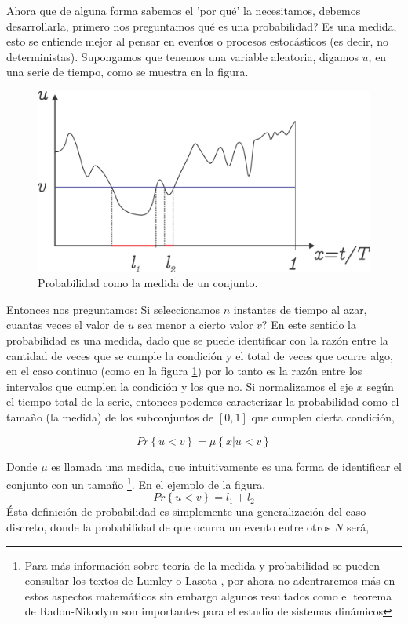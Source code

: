 \documentclass[executivepaper,12pt]{article}
\numberwithin{equation}{section}
\begin{document}
Ahora que de alguna forma sabemos el 'por qué' la necesitamos, debemos desarrollarla, primero nos preguntamos qué es una probabilidad? Es una medida, esto se entiende mejor al pensar en eventos o procesos estocásticos (es decir, no deterministas). Supongamos que tenemos una variable aleatoria, digamos $u$, en una serie de tiempo, como se muestra en la figura.

\begin{figure}[H]
	\begin{center}
		\includegraphics[scale=0.9]{probabilidad1}
	\end{center}
	\caption{Probabilidad como la medida de un conjunto.}
	\label{fig-prob1}
\end{figure}


Entonces nos preguntamos: Si seleccionamos $n$ instantes de tiempo al azar, cuantas veces el valor de $u$ sea menor a cierto valor $v$?  En este sentido la probabilidad es una medida, dado que se puede identificar con la razón entre la cantidad de veces que se cumple la condición y el total de veces que ocurre algo, en el caso continuo (como en la figura \ref{fig-prob1}) por lo tanto es la razón entre los intervalos que cumplen la condición y los que no. Si normalizamos el eje $x$ según el tiempo total de la serie, entonces podemos caracterizar la probabilidad como el tamaño (la medida) de los subconjuntos de $[0,1]$ que cumplen cierta condición, 

\begin{equation}
	Pr\left\{u< v\right\}=\mu\left\{x\rvert u< v\right\}
\end{equation} 
          
Donde $\mu$ es llamada una medida, que intuitivamente es una forma de identificar el conjunto con un tamaño \footnote{Para más información sobre teoría de la medida y probabilidad se pueden consultar los textos de Lumley \parencite{lumley2007} o Lasota \parencite{lasota2013}, por ahora no adentraremos más en estos aspectos matemáticos sin embargo algunos resultados como el teorema de Radon-Nikodym son importantes para el estudio de sistemas dinámicos}. En el ejemplo de la figura, 
\begin{equation}
	Pr\left\{u< v\right\}=l_1 + l_2
\end{equation}
Ésta definición de probabilidad es simplemente una generalización del caso discreto, donde la probabilidad de que ocurra un evento entre otros $N$ será,
\end{document}
